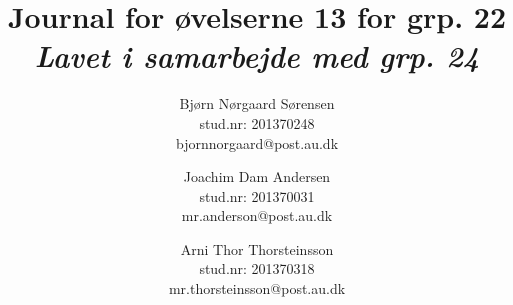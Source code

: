 

	\chead{\myTitle}	\rhead{\today}
\lfoot{}		\cfoot{}			\rfoot{\thepage}
\renewcommand{\headrulewidth}{1pt}
\renewcommand{\footrulewidth}{0pt}

\newcommand{\myTitle}{\textbf{Journal for øvelserne 13 for grp. 22}}
\newcommand{\mySubTitle}{\textit{Lavet i samarbejde med grp. 24}}

\title{\myTitle \\ \mySubTitle}
\author{
	Bjørn Nørgaard Sørensen\\
	stud.nr: 201370248\\
	bjornnorgaard@post.au.dk
	\and
	Joachim Dam Andersen\\
	stud.nr: 201370031\\
	mr.anderson@post.au.dk
	\and
	Arni Thor Thorsteinsson\\
	stud.nr: 201370318\\
	mr.thorsteinsson@post.au.dk
}


	\maketitle
	
	
	\newpage
	

